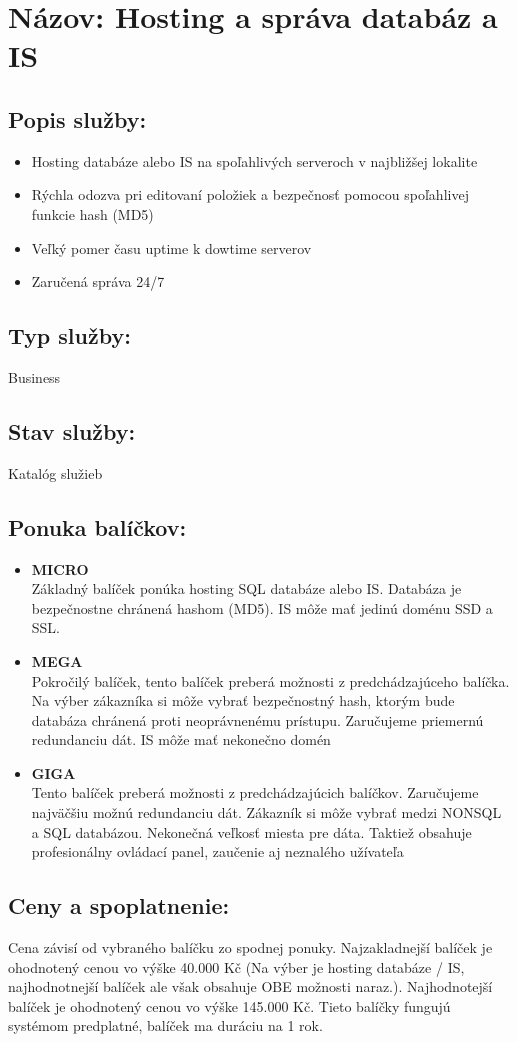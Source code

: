 \documentclass[a4paper, 11pt]{article}
\begin{document}
\section*{Názov: Hosting a správa databáz a IS}
\subsection*{Popis služby:}
\begin{itemize}
\item Hosting databáze alebo IS na spoľahlivých serveroch v najbližšej lokalite
\item Rýchla odozva pri editovaní položiek a bezpečnosť pomocou spoľahlivej funkcie hash (MD5)
\item Veľký pomer času uptime k dowtime serverov
\item Zaručená správa 24/7
\end{itemize}
\subsection*{Typ služby:}
Business
\subsection*{Stav služby:}
Katalóg služieb
\subsection*{Ponuka balíčkov:}
\begin{itemize}
\item \textbf{MICRO}\\
Základný balíček ponúka hosting SQL databáze alebo IS. Databáza je bezpečnostne chránená hashom (MD5). IS môže mať jedinú doménu SSD a SSL.
\item \textbf{MEGA}\\
Pokročilý balíček, tento balíček preberá možnosti z predchádzajúceho balíčka. Na výber zákazníka si môže vybrať bezpečnostný hash, ktorým bude databáza chránená proti neoprávnenému prístupu. Zaručujeme priemernú redundanciu dát. IS môže mať nekonečno domén
\item \textbf{GIGA}\\
Tento balíček preberá možnosti z predchádzajúcich balíčkov. Zaručujeme najväčšiu možnú redundanciu dát. Zákazník si môže vybrať medzi NONSQL a SQL databázou. Nekonečná veľkosť miesta pre dáta. Taktiež obsahuje profesionálny ovládací panel, zaučenie aj neznalého užívateľa
\end{itemize}
\subsection*{Ceny a spoplatnenie:}
Cena závisí od vybraného balíčku zo spodnej ponuky. Najzakladnejší balíček je ohodnotený cenou vo výške 40.000 Kč (Na výber je hosting databáze / IS, najhodnotnejší balíček ale však obsahuje OBE možnosti naraz.). Najhodnotejší balíček je ohodnotený cenou vo výške 145.000 Kč. Tieto balíčky fungujú systémom predplatné, balíček ma duráciu na 1 rok.
\end{document}

